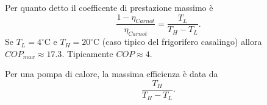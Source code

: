 \begin{remark}
Per quanto detto il coefficente di prestazione massimo \`e
\[\frac{1-\eta_{Carnot}}{\eta_{Carnot}}= \frac{T_L}{T_H-T_L}.\]
Se $T_L=4^\circ\mathrm{C}$ e $T_H=20^\circ\mathrm{C}$ (caso tipico del frigorifero casalingo) allora $COP_{max}\approx 17.3$. Tipicamente $COP\approx 4$.
\end{remark}
\begin{remark}
Per una pompa di calore, la massima efficienza \`e data da
\[\frac{T_H}{T_H-T_L}.\]
\end{remark}

